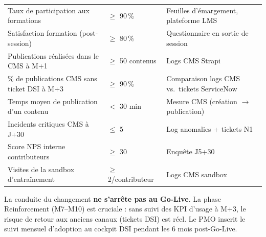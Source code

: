 \documentclass[11pt,a4paper,oneside]{report}
\begin{document}
\renewcommand{\arraystretch}{1.3}
\begin{tabularx}{\textwidth}{L{5cm} C{2cm} Y}
\toprule
{} &  &  \\
\midrule
Taux de participation aux formations & $\geq$ 90\,\% & Feuilles d'émargement, plateforme LMS \\
Satisfaction formation (post-session) & $\geq$ 80\,\% & Questionnaire en sortie de session \\
Publications réalisées dans le CMS à M+1 & $\geq$ 50 contenus & Logs CMS Strapi \\
\% de publications CMS sans ticket DSI à M+3 & $\geq$ 90\,\% & Comparaison logs CMS vs.\ tickets ServiceNow \\
Temps moyen de publication d'un contenu & $<$ 30 min & Mesure CMS (création $\rightarrow$ publication) \\
Incidents critiques CMS à J+30 & $\leq$ 5 & Log anomalies + tickets N1 \\
Score NPS interne contributeurs       & $\geq$ 30 & Enquête J5+30 \\
Visites de la sandbox d'entraînement   & $\geq$ 2/contributeur & Logs CMS sandbox \\
\bottomrule
\end{tabularx}

\begin{reco}
La conduite du changement \textbf{ne s'arrête pas au Go-Live}. La phase Reinforcement (M7--M10) est cruciale : sans suivi des KPI d'usage à M+3, le risque de retour aux anciens canaux (tickets DSI) est réel. Le PMO inscrit le suivi mensuel d'adoption au cockpit DSI pendant les 6 mois post-Go-Live.
\end{reco}
\end{document}

